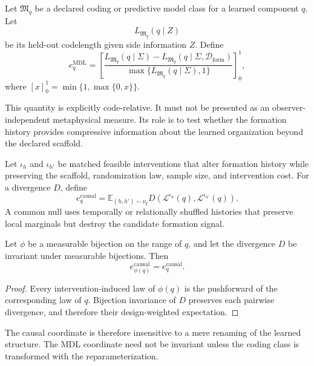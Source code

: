 \begin{definition}\label{def:mdl-endogeneity}
Let \(\mathfrak M_q\) be a declared coding or predictive model class for a
learned component \(q\). Let
\[
L_{\mathfrak M_q}(q\mid Z)
\]
be its held-out codelength given side information \(Z\). Define
\[
\boxed{
 e_q^{\mathrm{MDL}}
 =
 \left[
 \frac{
 L_{\mathfrak M_q}(q\mid\Sigma)
 -
 L_{\mathfrak M_q}(q\mid\Sigma,\mathcal D_{\mathrm{form}})
 }{
 \max\{L_{\mathfrak M_q}(q\mid\Sigma),1\}
 }
 \right]_{0}^{1},
}
\]
where \([x]_0^1=\min\{1,\max\{0,x\}\}\).
\end{definition}

This quantity is explicitly code-relative. It must not be presented as an
observer-independent metaphysical measure. Its role is to test whether the
formation history provides compressive information about the learned
organization beyond the declared scaffold.

\begin{definition}\label{def:causal-formation-sensitivity}
Let \(\iota_h\) and \(\iota_{h'}\) be matched feasible interventions that alter
formation history while preserving the scaffold, randomization law, sample
size, and intervention cost. For a divergence \(D\), define
\[
\boxed{
 e_q^{\mathrm{causal}}
 =
 \mathbb E_{(h,h')\sim\nu_q}
 D\!\left(
 \mathcal L^{\iota_h}(q),
 \mathcal L^{\iota_{h'}}(q)
 \right).
}
\]
A common null uses temporally or relationally shuffled histories that preserve
local marginals but destroy the candidate formation signal.
\end{definition}

\begin{proposition}
\label{prop:causal-provenance-invariance}
Let \(\phi\) be a measurable bijection on the range of \(q\), and let the
divergence \(D\) be invariant under measurable bijections. Then
\[
 e_{\phi(q)}^{\mathrm{causal}}
 =
 e_q^{\mathrm{causal}}.
\]
\end{proposition}

\begin{proof}
Every intervention-induced law of \(\phi(q)\) is the pushforward of the
corresponding law of \(q\). Bijection invariance of \(D\) preserves each
pairwise divergence, and therefore their design-weighted expectation.
\end{proof}

The causal coordinate is therefore insensitive to a mere renaming of the
learned structure. The MDL coordinate need not be invariant unless the coding
class is transformed with the reparameterization.

